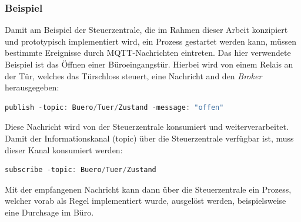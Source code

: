             \subsubsection*{Beispiel}
            \label{subsubsec:pubsub-example}
            Damit am Beispiel der Steuerzentrale, die im Rahmen dieser Arbeit konzipiert und prototypisch implementiert wird, 
            ein Prozess gestartet werden kann, müssen bestimmte Ereignisse durch \acs{MQTT}-Nachrichten eintreten. Das hier 
            verwendete Beispiel ist das Öffnen einer Büroeingangstür. Hierbei wird von einem Relais an der Tür, welches das 
            Türschloss steuert, eine Nachricht and den \textit{Broker} herausgegeben:
            \\
            \begin{lstlisting}[language=Java, frame=lines, xleftmargin=\parindent, style=algoBericht, label={code:pubmqtt}, captionpos=b, caption={Erzeugung und Veröffentlichung einer Nachricht}]
                publish -topic: Buero/Tuer/Zustand -message: "offen"
            \end{lstlisting}
            Diese Nachricht wird von der Steuerzentrale konsumiert und weiterverarbeitet. Damit der Informationskanal (topic) 
            über die Steuerzentrale verfügbar ist, muss dieser Kanal konsumiert werden: 
            \\
            \begin{lstlisting}[language=Java, frame=lines, xleftmargin=\parindent, style=algoBericht, label={code:submqtt}, captionpos=b, caption={Empfang und Konsum einer Nachricht}]
                subscribe -topic: Buero/Tuer/Zustand
            \end{lstlisting}
            Mit der empfangenen Nachricht kann dann über die Steuerzentrale ein Prozess, welcher vorab als Regel implementiert wurde, ausgelöst werden, 
            beispielsweise eine Durchsage im Büro.
    \pagebreak
